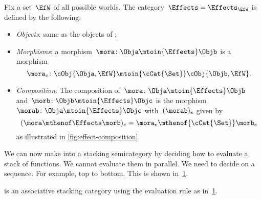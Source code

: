 \begin{definition}
    Fix a set~$\EfW$ of all possible worlds.
    The category~$\Effects=  \Effects_\EfW$ is defined by the following:
    \begin{itemize}
        \item \emph{Objects}: same as the objects of \cCat{\Set};
        \item \emph{Morphisms}: a morphism~$\mora\colon \Obja \mtoin{\Effects} \Objb$ is a morphism
              \begin{equation}
                  \mora_e\colon \cObj{\Obja, \EfW} \mtoin{\cCat{\Set}} \cObj{\Objb, \EfW}.
              \end{equation}
        \item \emph{Composition}: The composition of~$\mora\colon \Obja \mtoin{\Effects} \Objb$ and~$\morb\colon \Objb \mtoin{\Effects} \Objc$ is the morphism~$\morab\colon \Obja \mtoin{\Effects} \Objc$ with~$(\morab)_e$ given by
              \begin{equation}
                  (\mora \mthenof \Effects \morb)
                  _e = \mora_e \mthenof{\cCat{\Set}} \morb_e
              \end{equation}
              as illustrated in \cref{fig:effect-composition}.
    \end{itemize}
\end{definition}

We can now make \Effects into a stacking semicategory by deciding how to evaluate a stack of functions.
We cannot evaluate them in parallel.
We need to decide on a sequence.
For example, top to bottom.
This is shown in~\cref{fig:effect-stacking}.

\begin{lemma}
    \label{lem:effects-is-stacking}
    \Effects is an associative stacking category using the evaluation rule as in~\cref{fig:effect-stacking}.
\end{lemma}

\begin{figure}[h!]
    \centering
    \caption{}
    \label{fig:effect-stacking}
\end{figure}

